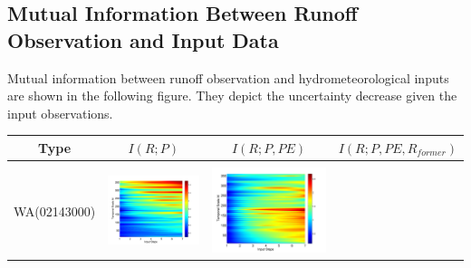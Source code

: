 \documentclass[review]{elsarticle}
\begin{document}
\subsection{Mutual Information Between Runoff Observation and Input Data}
Mutual information between runoff observation and hydrometeorological inputs are shown in the following figure. They depict the uncertainty decrease given the input observations. 
\begin{table}[H]\small 
\label{MI}
\centering
\begin{tabular}{cccc}
\hline
Type&$I(R;P)$&$I(R;P,PE)$&$I(R;P,PE,R_{former})$\\\hline
\\
WA(02143000)
&\begin{minipage}{.3\textwidth}\includegraphics[width=\linewidth]{resultgraph/02143000p.png}\end{minipage}
&\begin{minipage}{.3\textwidth}\includegraphics[width=\linewidth]{resultgraph/02143000pep.png}\end{minipage}

\end{tabular}
\end{table}
\end{document}
